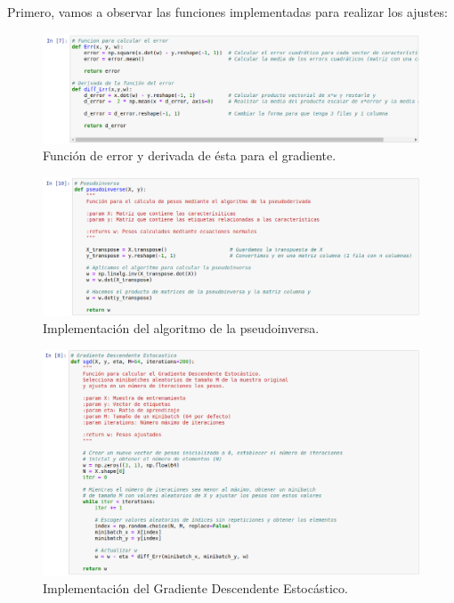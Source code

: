 \documentclass[11pt,a4paper]{article}
\begin{document}
Primero, vamos a observar las funciones implementadas para realizar los ajustes:

\begin{figure}[H]
\centering
\includegraphics[scale=0.4]{img/func_error.png}
\caption{Función de error y derivada de ésta para el gradiente.}
\end{figure}

\begin{figure}[H]
\centering
\includegraphics[scale=0.4]{img/pseudoinverse.png}
\caption{Implementación del algoritmo de la pseudoinversa.}
\end{figure}

\begin{figure}[H]
\centering
\includegraphics[scale=0.4]{img/sgd.png}
\caption{Implementación del Gradiente Descendente Estocástico.}
\end{figure}
\end{document}
